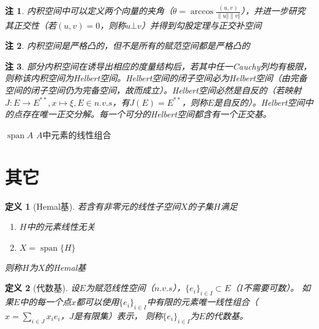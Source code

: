 \documentclass{article}                     %
\numberwithin{equation}{section}            %
\numberwithin{figure}{section}              %
\numberwithin{table}{section}               %
\DeclareMathOperator{\spann}{span}          %
\newtheorem{definition}{\indent 定义}[section]
\newtheorem{remark}{\indent 注}[section]
\begin{document}
\begin{remark}
    内积空间中可以定义两个向量的夹角（$\theta =\arccos {\frac{(u,v)}{\| u\Vert\| v\Vert  } }$），并进一步研究其正交性（若$(u,v)=0$，则称$u\bot v$）并得到勾股定理与正交补空间
\end{remark}
\begin{remark}
    内积空间是严格凸的，但不是所有的赋范空间都是严格凸的
\end{remark}
\begin{remark}
    部分内积空间在诱导出相应的度量结构后，若其中任一Cauchy列均有极限，则称该内积空间为Helbert空间。Helbert空间的闭子空间必为Helbert空间（由完备空间的闭子空间仍为完备空间，故而成立）。Helbert空间必然是自反的（若映射$J:E\to E^{\ast \ast },x\mapsto \xi ,E\in n.v.s$，有$J(E)=E^{\ast \ast }$，则称$E$是自反的）。Helbert空间中的点存在唯一正交分解。每一个可分的Helbert空间都含有一个正交基。
\end{remark}


$\spann {A}$ $A$中元素的线性组合









\section{其它}
\begin{definition}[Hemal基]
    若含有非零元的线性子空间$X$的子集$H$满足
    \begin{enumerate}
        \item $H$中的元素线性无关
        \item $X=\spann\{H\}$
    \end{enumerate}
    则称$H$为$X$的Hemal基
\end{definition}

\begin{definition}[代数基]
    设$E$为赋范线性空间（$n.v.s$），$\{e_i\}_{i\in I}\subset E$（$I$不需要可数）。
    如果$E$中的每一个点$x$都可以使用$\{e_i\}_{i\in I}$中有限的元素唯一线性组合（$x=\sum_{i\in J}x_ie_i$，$J$是有限集）表示，
    则称$\{e_i\}_{i\in I}$为$E$的代数基。
\end{definition}
\end{document}
